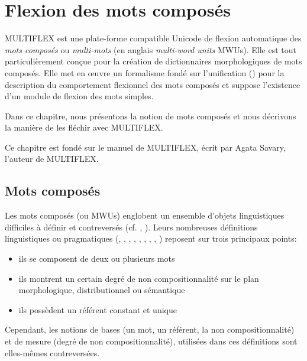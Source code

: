 \chapter{Flexion des mots composés}

\label{chap-multiflex}
MULTIFLEX est une plate-forme compatible Unicode de flexion automatique des \textit{mots composés}
ou \textit{multi-mots} (en anglais \textit{multi-word units}  MWUs).
Elle est tout particulièrement conçue pour la création de dictionnaires morphologiques de mots
composés.
Elle met en {\oe}uvre un formalisme fondé sur l'unification (\cite{Savary05}) 
pour la description du comportement flexionnel des mots composés et suppose l'existence d'un module
de flexion des mots simples.

\bigskip
\noindent Dans ce chapitre, nous présentons la notion de mots composés et nous décrivons la manière
de les fléchir avec MULTIFLEX.

\bigskip
\noindent Ce chapitre est fondé sur le manuel de MULTIFLEX, écrit par Agata Savary, l'auteur de
MULTIFLEX.

\section{Mots composés}
\label{section:MWUs}
Les mots composés (ou MWUs) englobent un ensemble d'objets linguistiques difficiles à définir et
contreversés  (cf. \cite{HabertJacquemin93}, \cite{Corbin92}). Leurs nombreuses définitions
linguistiques ou pragmatiques (\cite{Benven74}, \cite{Downing77}, \cite{Levi78}, 
\cite{Bauer83}, \cite{Gross90}, \cite{Anscombre90}, \cite{max-1993},
\cite{Gross96}, \cite{Cadiot92}) reposent sur trois principaux points:

\begin{itemize}
\item ils se composent de deux ou plusieurs mots
\item ils montrent un certain degré de non compositionnalité sur le plan morphologique,
	distributionnel ou sémantique
\item ils possèdent un référent constant et unique
\end{itemize}

\bigskip
\noindent Cependant, les notions de bases (un mot, un référent, la non compositionnalité) et de
mesure (degré de non compositionnalité), utilisées dans ces  définitions sont elles-mêmes
contreversées.

